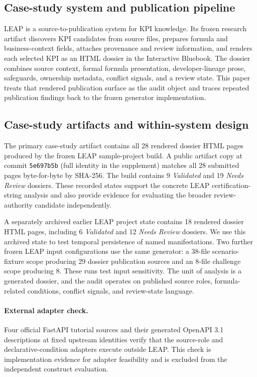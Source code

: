 \documentclass[a4paper,fleqn]{cas-dc}
\begin{document}
\subsection{Case-study system and publication pipeline}
LEAP is a source-to-publication system for KPI knowledge. Its frozen research artifact discovers KPI candidates from source files, prepares formula and business-context fields, attaches provenance and review information, and renders each selected KPI as an HTML dossier in the Interactive Bluebook. The dossier combines source context, formal formula presentation, developer-lineage prose, safeguards, ownership metadata, conflict signals, and a review state. This paper treats that rendered publication surface as the audit object and traces repeated publication findings back to the frozen generator implementation.

\subsection{Case-study artifacts and within-system design}
The primary case-study artifact contains all 28 rendered dossier HTML pages produced by the frozen LEAP sample-project build. A public artifact copy at commit \texttt{5e697b5b} (full identity in the supplement) matches all 28 submitted pages byte-for-byte by SHA-256. The build contains 9 \emph{Validated} and 19 \emph{Needs Review} dossiers. These recorded states support the concrete LEAP certification-string analysis and also provide evidence for evaluating the broader review-authority candidate independently.

A separately archived earlier LEAP project state contains 18 rendered dossier HTML pages, including 6 \emph{Validated} and 12 \emph{Needs Review} dossiers. We use this archived state to test temporal persistence of named manifestations. Two further frozen LEAP input configurations use the same generator: a 38-file scenario-fixture scope producing 29 dossier publication sources and an 8-file challenge scope producing 8. These runs test input sensitivity. The unit of analysis is a generated dossier, and the audit operates on published source roles, formula-related conditions, conflict signals, and review-state language.

\paragraph{External adapter check.} Four official FastAPI tutorial sources and their generated OpenAPI 3.1 descriptions at fixed upstream identities \citep{FastAPI2026,OpenAPI31} verify that the source-role and declarative-condition adapters execute outside LEAP. This check is implementation evidence for adapter feasibility and is excluded from the independent construct evaluation.
\end{document}
